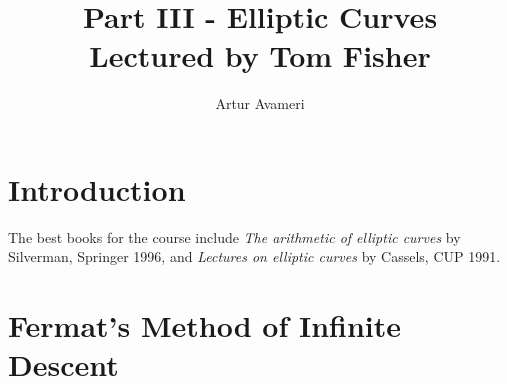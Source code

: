 \documentclass{article}
\title{Part III - Elliptic Curves
    \\ \large
    Lectured by Tom Fisher 
}
\author{Artur Avameri}
\date{}
\theoremstyle{definition}
\begin{document}
\maketitle
\tableofcontents
\newpage
 
\section{Introduction}

The best books for the course include \textit{The arithmetic of elliptic curves} by Silverman, Springer 1996, and \textit{Lectures on elliptic curves} by Cassels, CUP 1991. 

\section{Fermat's Method of Infinite Descent}
\end{document}
